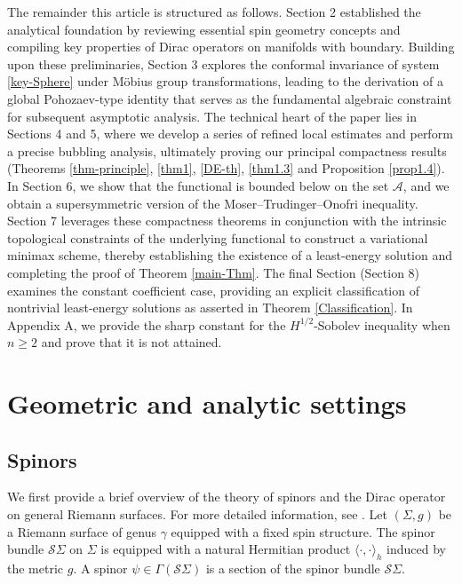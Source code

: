 \documentclass[a4paper, 12pt]{article}
\begin{document}
The remainder this article is structured as follows. Section 2 established the analytical foundation by reviewing essential spin geometry concepts and compiling key properties of Dirac operators on manifolds with boundary. Building upon these preliminaries, Section 3 explores the conformal invariance of system \eqref{key-Sphere} under M\"obius group transformations, leading to the derivation of a global Pohozaev-type identity that serves as the fundamental algebraic constraint for subsequent asymptotic analysis. The technical heart of the paper lies in Sections 4 and 5, where we develop a series of refined local estimates and perform a precise bubbling analysis, ultimately proving our principal compactness results (Theorems \ref{thm-principle}, \ref{thm1}, \ref{DE-th}, \ref{thm1.3} and Proposition \ref{prop1.4}). In Section 6, we show that the functional is bounded below on the set \(\mathcal{A}\), and we obtain a supersymmetric version of the Moser–Trudinger–Onofri inequality. Section 7 leverages these compactness theorems in conjunction with the intrinsic topological constraints of the underlying functional to construct a variational minimax scheme, thereby establishing the existence of a least-energy solution and completing the proof of Theorem \ref{main-Thm}. The final Section (Section 8) examines the constant coefficient case, providing an explicit classification of nontrivial least-energy solutions as asserted in Theorem \ref{Classification}. In Appendix A, we provide the sharp constant for the \(H^{1/2}\)-Sobolev inequality when \(n \geq 2\) and prove that it is not attained.
\section{Geometric and analytic settings}


\subsection{Spinors}
We first provide a brief overview of the theory of spinors and the Dirac operator on general Riemann surfaces. For more detailed information, see \cite{MR2509837,MR1031992,MR1867733}. Let \((\Sigma,g)\) be a Riemann surface of genus \(\gamma\) equipped with a fixed spin structure. The spinor bundle \(\mathcal{S}\Sigma\) on \(\Sigma\) is equipped with a natural Hermitian product \(\langle\cdot, \cdot\rangle_h\) induced by the metric \(g\). A spinor \(\psi \in \Gamma(\mathcal{S}\Sigma)\) is a section of the spinor bundle \(\mathcal{S}\Sigma\).
\end{document}
